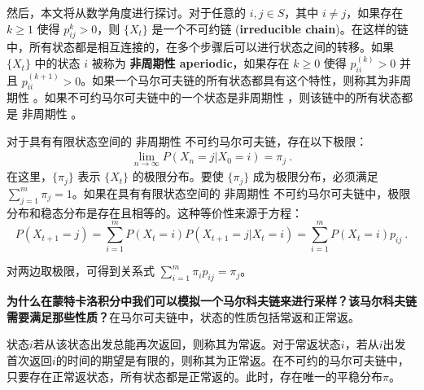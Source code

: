 然后，本文将从数学角度进行探讨。对于任意的 $i,j\in S$，其中 $i \neq j$，如果存在 $k\geq 1$ 使得 $p_{ij}^k > 0$，则 $\{X_t\}$ 是一个不可约链 (\textbf{irreducible chain})。在这样的链中，所有状态都是相互连接的，在多个步骤后可以进行状态之间的转移。如果 $\{X_t\}$ 中的状态 $i$ 被称为 \textbf{非周期性  aperiodic}，如果存在 $k\geq 0$ 使得 $p_{ii}^{(k)} > 0$ 并且 $p_{ii}^{(k+1) } > 0$。如果一个马尔可夫链的所有状态都具有这个特性，则称其为非周期性 。如果不可约马尔可夫链中的一个状态是非周期性  ，则该链中的所有状态都是 非周期性 。

对于具有有限状态空间的 非周期性 不可约马尔可夫链，存在以下极限：
\begin{align}
   \lim_{n\to\infty} P(X_n = j | X_0=i) = \pi_j~.
\end{align}
在这里，$\{\pi_j\}$ 表示 $\{X_t\}$ 的极限分布。要使 $\{\pi_j\}$ 成为极限分布，必须满足 $\sum_{j=1}^m \pi_j=1$。如果在具有有限状态空间的 非周期性  不可约马尔可夫链中，极限分布和稳态分布是存在且相等的。这种等价性来源于方程：
\begin{equation} 
P(X_{t+1}=j)=\sum_{i=1}^{m}P(X_{t}=i)P(X_{t+1}=j|X_ {t}=i)=\sum_{i=1}^{m}P(X_{t}=i)p_{i j}~.
\end{equation}

对两边取极限，可得到关系式 $\sum_{i=1}^m \pi_i p_{ij} = \pi_j$。 

\textbf{为什么在蒙特卡洛积分中我们可以模拟一个马尔科夫链来进行采样？该马尔科夫链需要满足那些性质？}在马尔可夫链中，状态的性质包括常返和正常返。

状态$i$若从该状态出发总能再次返回，则称其为常返。对于常返状态$i$，若从$i$出发首次返回$i$的时间的期望是有限的，则称其为正常返。在不可约的马尔可夫链中，只要存在正常返状态，所有状态都是正常返的。此时，存在唯一的平稳分布$\pi$。